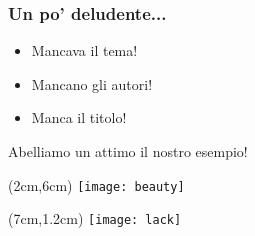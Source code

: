 \begin{frame}
 
 \frametitle{Un po' deludente...}
 
 \begin{itemize}
  \item Mancava il tema!
  \item Mancano gli autori!
  \item Manca il titolo!
 \end{itemize}
 
 Abelliamo un attimo il nostro esempio!
 
 \begin{textblock*}{5cm}(2cm,6cm)
    \texttt{[image: beauty]}
 \end{textblock*}
 
 
 \begin{textblock*}{5cm}(7cm,1.2cm)
    \texttt{[image: lack]}
 \end{textblock*}

\end{frame}
 
